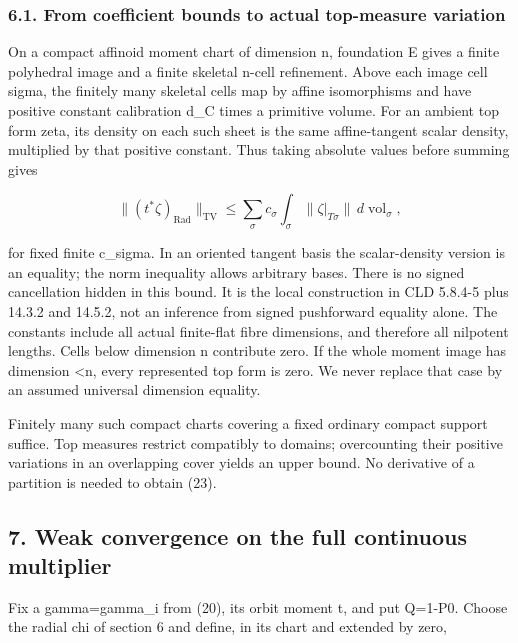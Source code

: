 \documentclass[
  10pt,
]{article}
\begin{document}
\subsubsection{6.1. From coefficient bounds to actual top-measure
variation}\label{from-coefficient-bounds-to-actual-top-measure-variation}

On a compact affinoid moment chart of dimension n, foundation E gives a
finite polyhedral image and a finite skeletal n-cell refinement. Above
each image cell sigma, the finitely many skeletal cells map by affine
isomorphisms and have positive constant calibration d\_C times a
primitive volume. For an ambient top form zeta, its density on each such
sheet is the same affine-tangent scalar density, multiplied by that
positive constant. Thus taking absolute values before summing gives

\[
 \|(t^*\zeta)_{\mathrm{Rad}}\|_{\mathrm{TV}}
 \leq\sum_{\sigma} c_\sigma
        \int_\sigma\|\zeta|_{T\sigma}\|\,d\operatorname{vol}_\sigma,
                                                                  \tag{23}
\]

for fixed finite c\_sigma. In an oriented tangent basis the
scalar-density version is an equality; the norm inequality allows
arbitrary bases. There is no signed cancellation hidden in this bound.
It is the local construction in CLD 5.8.4-5 plus 14.3.2 and 14.5.2, not
an inference from signed pushforward equality alone. The constants
include all actual finite-flat fibre dimensions, and therefore all
nilpotent lengths. Cells below dimension n contribute zero. If the whole
moment image has dimension \textless n, every represented top form is
zero. We never replace that case by an assumed universal dimension
equality.

Finitely many such compact charts covering a fixed ordinary compact
support suffice. Top measures restrict compatibly to domains;
overcounting their positive variations in an overlapping cover yields an
upper bound. No derivative of a partition is needed to obtain (23).

\subsection{7. Weak convergence on the full continuous
multiplier}\label{weak-convergence-on-the-full-continuous-multiplier}

Fix a gamma=gamma\_i from (20), its orbit moment t, and put Q=1-P0.
Choose the radial chi of section 6 and define, in its chart and extended
by zero,
\end{document}
